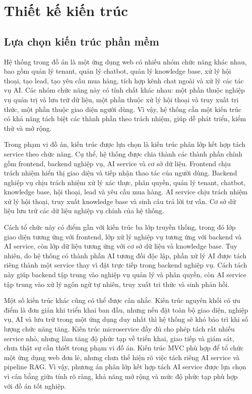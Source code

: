 \documentclass[../DoAn.tex]{subfiles}
\begin{document}
\section{Thiết kế kiến trúc}

\subsection{Lựa chọn kiến trúc phần mềm}

Hệ thống trong đồ án là một ứng dụng web có nhiều nhóm chức năng khác nhau, bao gồm quản lý tenant, quản lý chatbot, quản lý knowledge base, xử lý hội thoại, tạo lead, tạo yêu cầu mua hàng, tích hợp kênh chat ngoài và xử lý các tác vụ AI. Các nhóm chức năng này có tính chất khác nhau: một phần thuộc nghiệp vụ quản trị và lưu trữ dữ liệu, một phần thuộc xử lý hội thoại và truy xuất tri thức, một phần thuộc giao diện người dùng. Vì vậy, hệ thống cần một kiến trúc có khả năng tách biệt các thành phần theo trách nhiệm, giúp dễ phát triển, kiểm thử và mở rộng.

Trong phạm vi đồ án, kiến trúc được lựa chọn là kiến trúc phân lớp kết hợp tách service theo chức năng. Cụ thể, hệ thống được chia thành các thành phần chính gồm frontend, backend nghiệp vụ, AI service và cơ sở dữ liệu. Frontend chịu trách nhiệm hiển thị giao diện và tiếp nhận thao tác của người dùng. Backend nghiệp vụ chịu trách nhiệm xử lý xác thực, phân quyền, quản lý tenant, chatbot, knowledge base, hội thoại, lead và yêu cầu mua hàng. AI service chịu trách nhiệm xử lý hội thoại, truy xuất knowledge base và sinh câu trả lời tư vấn. Cơ sở dữ liệu lưu trữ các dữ liệu nghiệp vụ chính của hệ thống.

Cách tổ chức này có điểm gần với kiến trúc ba lớp truyền thống, trong đó lớp giao diện tương ứng với frontend, lớp xử lý nghiệp vụ tương ứng với backend và AI service, còn lớp dữ liệu tương ứng với cơ sở dữ liệu và knowledge base. Tuy nhiên, do hệ thống có thành phần AI tương đối độc lập, phần xử lý AI được tách riêng thành một service thay vì đặt trực tiếp trong backend nghiệp vụ. Cách tách này giúp backend tập trung vào nghiệp vụ quản lý và phân quyền, còn AI service tập trung vào xử lý ngôn ngữ tự nhiên, truy xuất tri thức và sinh phản hồi.

Một số kiến trúc khác cũng có thể được cân nhắc. Kiến trúc nguyên khối có ưu điểm là đơn giản khi triển khai ban đầu, nhưng nếu đặt toàn bộ giao diện, nghiệp vụ, AI và lưu trữ trong một ứng dụng duy nhất thì hệ thống sẽ khó bảo trì khi số lượng chức năng tăng. Kiến trúc microservice đầy đủ cho phép tách rất nhiều service nhỏ, nhưng làm tăng độ phức tạp về triển khai, giao tiếp và giám sát, chưa thật sự cần thiết trong phạm vi đồ án. Kiến trúc MVC phù hợp để tổ chức một ứng dụng web đơn lẻ, nhưng chưa thể hiện rõ việc tách riêng AI service và pipeline RAG. Vì vậy, phương án phân lớp kết hợp tách AI service được lựa chọn vì cân bằng giữa tính rõ ràng, khả năng mở rộng và mức độ phức tạp phù hợp với đồ án tốt nghiệp.
\end{document}
